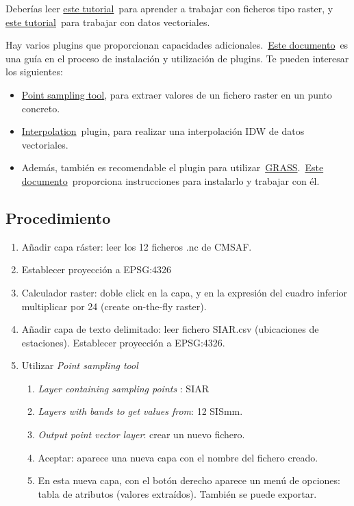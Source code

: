 \documentclass[11pt]{article}
\begin{document}
Deberías leer \href{https://docs.qgis.org/3.22/es/docs/user\_manual/working\_with\_raster/index.html}{este tutorial} para aprender a trabajar con ficheros tipo
raster, y \href{http://docs.qgis.org/3.22/es/docs/user\_manual/working\_with\_vector/index.html}{este tutorial} para trabajar con datos vectoriales.

Hay varios plugins que proporcionan capacidades adicionales. \href{https://docs.qgis.org/3.22/es/docs/training\_manual/qgis\_plugins/fetching\_plugins.html}{Este
documento} es una guía en el proceso de instalación y utilización de
plugins. Te pueden interesar los siguientes:

\begin{itemize}
\item \href{https://plugins.qgis.org/plugins/pointsamplingtool/}{Point sampling tool}, para extraer valores de un fichero raster en un
punto concreto.
\item \href{https://docs.qgis.org/3.22/es/docs/user\_manual/plugins/plugins\_interpolation.html}{Interpolation} plugin, para realizar una interpolación IDW de datos
vectoriales.
\item Además, también es recomendable el plugin para utilizar \href{https://grass.osgeo.org/}{GRASS}. \href{http://docs.qgis.org/3.22/es/docs/user\_manual/grass\_integration/grass\_integration.html}{Este
documento} proporciona instrucciones para instalarlo y trabajar con
él.
\end{itemize}

\subsection*{Procedimiento}
\label{sec:orge72c353}

\begin{enumerate}
\item Añadir capa ráster: leer los 12 ficheros .nc de CMSAF.
\item Establecer proyección a EPSG:4326
\item Calculador raster: doble click en la capa, y en la expresión del
cuadro inferior multiplicar por 24 (create on-the-fly raster).
\item Añadir capa de texto delimitado: leer fichero SIAR.csv (ubicaciones
de estaciones). Establecer proyección a EPSG:4326.
\item Utilizar \emph{Point sampling tool}
\begin{enumerate}
\item \emph{Layer containing sampling points} : SIAR
\item \emph{Layers with bands to get values from}: 12 SISmm.
\item \emph{Output point vector layer}: crear un nuevo fichero.
\item Aceptar: aparece una nueva capa con el nombre del fichero creado.
\item En esta nueva capa, con el botón derecho aparece un menú de
  opciones: tabla de atributos (valores extraídos). También se puede
  exportar.
\end{enumerate}
\end{enumerate}
\end{document}
